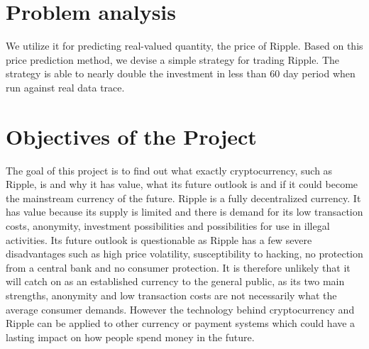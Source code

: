 \section{Problem analysis}

We utilize it for predicting real-valued quantity, the price of Ripple. Based on
this  price  prediction  method,  we  devise  a  simple
strategy for trading Ripple. The strategy is able
to nearly double the investment in less than 60 day
period when run against real data trace.


\section{Objectives of the Project}
The  goal of this project is to find out what exactly cryptocurrency, such as Ripple, is and why it has value, what its future outlook is and if it could become the mainstream currency of the future. 
Ripple is a fully decentralized currency. It has value because its supply is limited 
and  there  is  demand  for  its  low  transaction  costs,  anonymity,  investment  possibilities  and 
possibilities for use in illegal activities. Its future outlook is questionable as Ripple has a few severe disadvantages such as high price volatility, susceptibility to hacking, no protection from a central bank and no consumer protection. It is therefore unlikely that it will catch on as an established  currency  to  the  general  public,  as  its  two  main  strengths,  anonymity  and  low 
transaction  costs  are  not  necessarily  what  the  average  consumer  demands. 
However  the technology behind  cryptocurrency  and  Ripple can  be  applied  to  other  currency  or  payment systems which could have a lasting impact on how people spend money in the future.